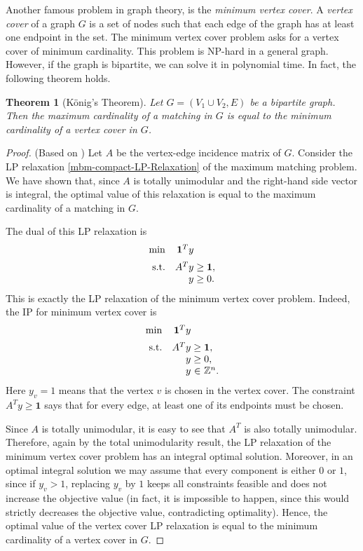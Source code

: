 \documentclass[12pt]{report}
\newtheorem{ttheorem}[base]{Theorem}
\numberwithin{algorithm}{chapter}
\begin{document}
	Another famous problem in graph theory, is the \emph{minimum vertex cover}. A \emph{vertex cover} of a graph $G$ is a set of nodes such that each edge of the graph has at least one endpoint in the set. The minimum vertex cover problem asks for a vertex cover of minimum cardinality. This problem is NP-hard in a general graph. However, if the graph is bipartite, we can solve it in polynomial time. In fact, the following theorem holds.
	
	\begin{ttheorem}[K\"onig's Theorem]
		Let $G=(V_1\cup V_2,E)$ be a bipartite graph. Then the maximum cardinality of a matching in $G$ is equal to the minimum cardinality of a vertex cover in $G$.
	\end{ttheorem}
	
	\begin{proof}
		(Based on \cite[Chapter 8, pp. 146-147]{matousek2007understanding}) Let $A$ be the vertex-edge incidence matrix of $G$. Consider the LP relaxation \eqref{mbm-compact-LP-Relaxation} of the maximum matching problem. We have shown that, since $A$ is totally unimodular and the right-hand side vector is integral, the optimal value of this relaxation is equal to the maximum cardinality of a matching in $G$.
		
		The dual of this LP relaxation is
		\[
		\begin{array}{r@{\quad}r@{\;}c@{\;}l}
			\min & \mathbf{1}^T y \\[2mm]
			\text{s.t.}
			& A^T y & \geq & \mathbf{1},\\
			& y & \geq & 0.
		\end{array}
		\]
		This is exactly the LP relaxation of the minimum vertex cover problem. Indeed, the IP for minimum vertex cover is
		\[
		\begin{array}{r@{\quad}r@{\;}c@{\;}l}
			\min & \mathbf{1}^T y \\[2mm]
			\text{s.t.}
			& A^T y & \geq & \mathbf{1},\\
			& y & \geq & 0,\\
			& y & \in & \mathbb{Z}^{n}.
		\end{array}
		\]
		Here $y_v=1$ means that the vertex $v$ is chosen in the vertex cover. The constraint $A^Ty\geq \mathbf{1}$ says that for every edge, at least one of its endpoints must be chosen.
		
		Since $A$ is totally unimodular, it is easy to see that $A^T$ is also totally unimodular. Therefore, again by the total unimodularity result, the LP relaxation of the minimum vertex cover problem has an integral optimal solution. Moreover, in an optimal integral solution we may assume that every component is either $0$ or $1$, since if $y_v>1$, replacing $y_v$ by $1$ keeps all constraints feasible and does not increase the objective value (in fact, it is impossible to happen, since this would strictly decreases the objective value, contradicting optimality). Hence, the optimal value of the vertex cover LP relaxation is equal to the minimum cardinality of a vertex cover in $G$.
		

\end{proof}
\end{document}
